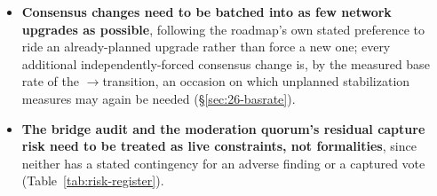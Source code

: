 \begin{itemize}
{visible.} Simultaneous activation (\S\ref{sec:26-schedule}) means no external observer can confirm
\PNR pays operators before parallel-asset mining rewards are retired; any activation announcement
should say so rather than let a reader assume the roadmap's original 90-day-notice checkpoint still
applies.
\item \textbf{Consensus changes need to be batched into as few network upgrades as possible},
following the roadmap's own stated preference to ride an already-planned upgrade rather than force a
new one; every additional independently-forced consensus change is, by the measured base rate of the
\PoW$\to$\PoN transition, an occasion on which unplanned stabilization measures may again be needed
(\S\ref{sec:26-basrate}).
\item \textbf{The bridge audit and the moderation quorum's residual capture risk need to be treated
as live constraints, not formalities}, since neither has a stated contingency for an adverse finding
or a captured vote (Table~\ref{tab:risk-register}).
\end{itemize}

\FloatBarrier
